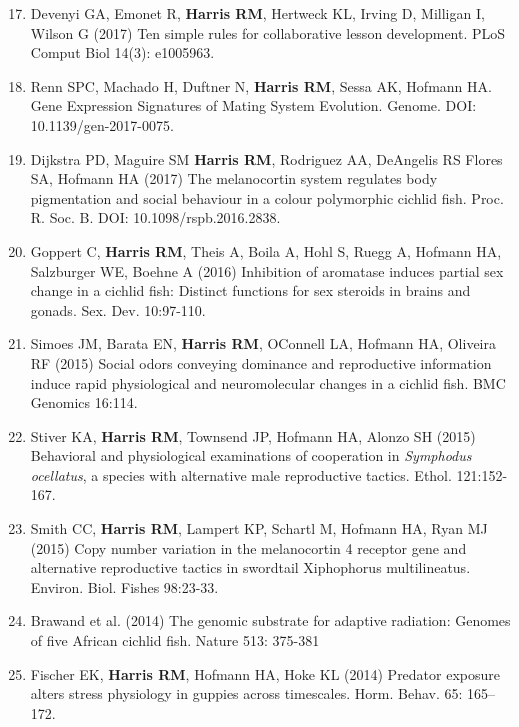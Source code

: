 \documentclass[margin,line]{CV}
\newenvironment{benumerate}[1]{
    \let\oldItem\item
    \def\item{\addtocounter{enumi}{-2}\oldItem}
    \begin{enumerate}
    \setcounter{enumi}{#1}
    \addtocounter{enumi}{1}
}{
    \end{enumerate}
}
\begin{document}
\begin{resume}
\begin{benumerate}{16}
\setlength{\itemsep}{3pt}

\item Devenyi GA, Emonet R, {\bf Harris RM}, Hertweck KL, Irving D, Milligan I, Wilson G (2017) Ten simple rules for collaborative lesson development. PLoS Comput Biol 14(3): e1005963.

\item Renn SPC, Machado H, Duftner N, {\bf Harris RM}, Sessa AK, Hofmann HA. Gene Expression Signatures of Mating System Evolution. Genome. DOI: 10.1139/gen-2017-0075.

\item Dijkstra PD, Maguire SM {\bf Harris RM}, Rodriguez AA, DeAngelis RS Flores SA, Hofmann HA (2017) The melanocortin system regulates body pigmentation and social behaviour in a colour polymorphic cichlid fish. Proc. R. Soc. B. DOI: 10.1098/rspb.2016.2838.

\item Goppert C, {\bf Harris RM}, Theis A, Boila A, Hohl S, Ruegg A, Hofmann HA, Salzburger WE, Boehne A (2016) Inhibition of aromatase induces partial sex change in a cichlid fish: Distinct functions for sex steroids in brains and gonads. Sex. Dev. 10:97-110.

\item Simoes JM, Barata EN, {\bf Harris RM}, O\textsc{}Connell LA, Hofmann HA, Oliveira RF (2015) Social odors conveying dominance and reproductive information induce rapid physiological and neuromolecular changes in a cichlid fish. BMC Genomics 16:114. 

\item Stiver KA, {\bf Harris RM}, Townsend JP, Hofmann HA, Alonzo SH (2015) Behavioral and physiological examinations of cooperation in {\it Symphodus ocellatus}, a species with alternative male reproductive tactics. Ethol. 121:152-167.

\item Smith CC, {\bf Harris RM}, Lampert KP, Schartl M, Hofmann HA, Ryan MJ (2015) Copy number variation in the melanocortin 4 receptor gene and alternative reproductive tactics in swordtail Xiphophorus multilineatus. Environ. Biol. Fishes 98:23-33.

\item Brawand et al. (2014) The genomic substrate for adaptive radiation: Genomes of five African cichlid fish. Nature 513: 375-381

\item Fischer EK, {\bf Harris RM}, Hofmann HA, Hoke KL (2014) Predator exposure alters stress physiology in guppies across timescales. Horm. Behav. 65: 165–172. 


\end{benumerate}
\end{resume}
\end{document}
